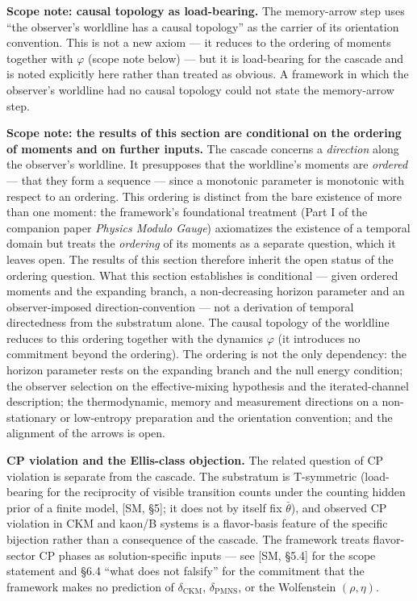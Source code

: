 \documentclass[
]{article}
\begin{document}
\textbf{Scope note: causal topology as load-bearing.} The memory-arrow
step uses ``the observer's worldline has a causal topology'' as the
carrier of its orientation convention. This is not a new axiom --- it
reduces to the ordering of moments together with \(\varphi\) (scope note
below) --- but it is load-bearing for the cascade and is noted
explicitly here rather than treated as obvious. A framework in which the
observer's worldline had no causal topology could not state the
memory-arrow step.

\textbf{Scope note: the results of this section are conditional on the
ordering of moments and on further inputs.} The cascade concerns a
\emph{direction} along the observer's worldline. It presupposes that the
worldline's moments are \emph{ordered} --- that they form a sequence ---
since a monotonic parameter is monotonic with respect to an ordering.
This ordering is distinct from the bare existence of more than one
moment: the framework's foundational treatment (Part I of the companion
paper \emph{Physics Modulo Gauge}) axiomatizes the existence of a
temporal domain but treats the \emph{ordering} of its moments as a
separate question, which it leaves open. The results of this section
therefore inherit the open status of the ordering question. What this
section establishes is conditional --- given ordered moments and the
expanding branch, a non-decreasing horizon parameter and an
observer-imposed direction-convention --- not a derivation of temporal
directedness from the substratum alone. The causal topology of the
worldline reduces to this ordering together with the dynamics
\(\varphi\) (it introduces no commitment beyond the ordering). The
ordering is not the only dependency: the horizon parameter rests on the
expanding branch and the null energy condition; the observer selection
on the effective-mixing hypothesis and the iterated-channel description;
the thermodynamic, memory and measurement directions on a non-stationary
or low-entropy preparation and the orientation convention; and the
alignment of the arrows is open.

\textbf{CP violation and the Ellis-class objection.} The related
question of CP violation is separate from the cascade. The substratum is
T-symmetric (load-bearing for the reciprocity of visible transition
counts under the counting hidden prior of a finite model, {[}SM, §5{]};
it does not by itself fix \(\bar\theta\)), and observed CP violation in
CKM and kaon/B systems is a flavor-basis feature of the specific
bijection rather than a consequence of the cascade. The framework treats
flavor-sector CP phases as solution-specific inputs --- see {[}SM,
§5.4{]} for the scope statement and §6.4 ``what does not falsify'' for
the commitment that the framework makes no prediction of
\(\delta_{\text{CKM}}\), \(\delta_{\text{PMNS}}\), or the Wolfenstein
\((\rho, \eta)\).
\end{document}
